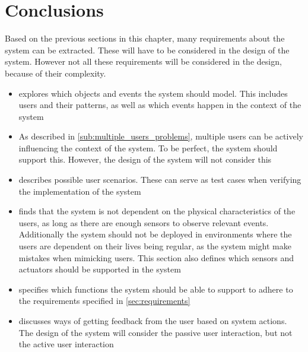 \section{Conclusions}

Based on the previous sections in this chapter, many requirements about the system can be extracted. These will have to be considered in the design of the system. However not all these requirements will be considered in the design, because of their complexity. 

\begin{itemize}
\item {} explores which objects and events the system should model. This includes users and their patterns, as well as which events happen in the context of the system
\item As described in \cref{sub:multiple_users_problems}, multiple users can be actively influencing the context of the system. To be perfect, the system should support this. However, the design of the system will not consider this
\item {} describes possible user scenarios. These can serve as test cases when verifying the implementation of the system
\item {} finds that the system is not dependent on the physical characteristics of the users, as long as there are enough sensors to observe relevant events. Additionally the system should not be deployed in environments where the users are dependent on their lives being regular, as the system might make mistakes when mimicking users. This section also defines which sensors and actuators should be supported in the system
\item {} specifies which functions the system should be able to support to adhere to the requirements specified in \cref{sec:requirements}
\item {} discusses ways of getting feedback from the user based on system actions. The design of the system will consider the passive user interaction, but not the active user interaction
\end{itemize}